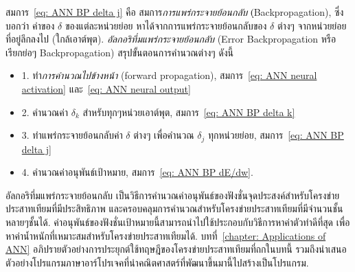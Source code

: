 สมการ~\ref{eq: ANN BP delta j} คือ สมการ\textit{การแพร่กระจายย้อนกลับ} (ฺBackpropagation), 
ซึ่ง บอกว่า ค่าของ $\delta$ ของแต่ละหน่วยย่อย หาได้จากการแพร่กระจายย้อนกลับของ $\delta$ ต่างๆ จากหน่วยย่อยที่อยู่ลึกลงไป (ใกล้เอาต์พุต).
\textit{อัลกอริทึ่มแพร่กระจายย้อนกลับ} (Error Backpropagation หรือ เรียกย่อๆ Backpropagation) สรุปขั้นตอนการคำนวณต่างๆ ดังนี้
\begin{itemize}
\item 1. ทำ\textit{การคำนวณไปข้างหน้า} (forward propagation), สมการ~\ref{eq: ANN neural activation} และ~\ref{eq: ANN neural output}
\item 2. คำนวณค่า $\delta_k$ สำหรับทุกๆหน่วยเอาต์พุต, สมการ~\ref{eq: ANN BP delta k}
\item 3. ทำแพร่กระจายย้อนกลับค่า $\delta$ ต่างๆ เพื่อคำนวณ $\delta_j$ ทุกหน่วยย่อย, สมการ~\ref{eq: ANN BP delta j}
\item 4. คำนวณค่าอนุพันธ์เป้าหมาย, สมการ~\ref{eq: ANN BP dE/dw}.
\end{itemize}

อัลกอริทึ่มแพร่กระจายย้อนกลับ เป็นวิธีการคำนวณค่าอนุพันธ์ของฟังชั่นจุดประสงค์สำหรับโครงข่ายประสาทเทียมที่มีประสิทธิภาพ
และครอบคลุมการคำนวณสำหรับโครงข่ายประสาทเทียมที่มีจำนวนชั้นหลายๆชั้นได้.
ค่าอนุพันธ์ของฟังชั่นเป้าหมายนี้สามารถนำไปใช้ประกอบกับวิธีการหาค่าตัวทำดีที่สุด 
เพื่อหาค่าน้ำหนักที่เหมาะสมสำหรับโครงข่ายประสาทเทียมได้.
บทที่~\ref{chapter: Applications of ANN} อภิปรายตัวอย่างการประยุกต์ใช้ทฤษฎีของโครงข่ายประสาทเทียมที่ถกในบทนี้
รวมถึงนำเสนอตัวอย่างโปรแกรมภาษาอาร์โปรเจคที่นำคณิตศาสตร์ที่พัฒนาขึ้นมานี้ไปสร้างเป็นโปรแกรม.


